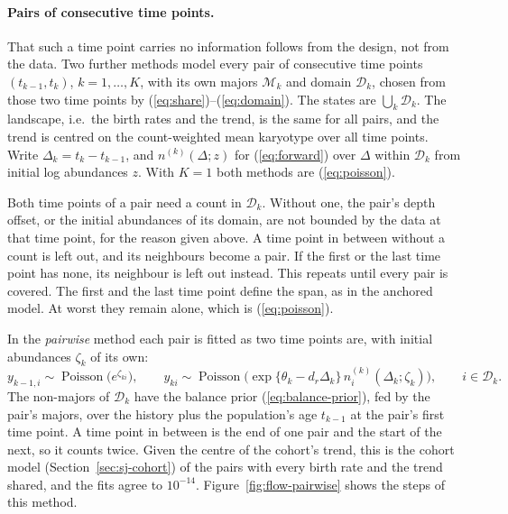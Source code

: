 \documentclass[11pt]{article}
\begin{document}
\paragraph{Pairs of consecutive time points.}
That such a time point carries no information follows from the design, not from
the data. Two further methods model every pair of consecutive time points
$(t_{k-1},t_k)$, $k=1,\dots,K$, with its own majors $\mathcal{M}_k$ and domain
$\mathcal{D}_k$, chosen from those two time points by (\ref{eq:share})--(\ref{eq:domain}).
The states are $\bigcup_k\mathcal{D}_k$. The landscape, i.e.\ the birth rates
and the trend, is the same for all pairs, and the trend is centred on the
count-weighted mean karyotype over all time points. Write $\Delta_k=t_k-t_{k-1}$, and
$n^{(k)}(\Delta;z)$ for (\ref{eq:forward}) over $\Delta$ within $\mathcal{D}_k$ from
initial log abundances $z$. With $K=1$ both methods are (\ref{eq:poisson}).

Both time points of a pair need a count in $\mathcal{D}_k$. Without one, the
pair's depth offset, or the initial abundances of its domain, are not bounded
by the data at that time point, for the reason given above. A time point in
between without a count is left out, and its neighbours become a pair. If the
first or the last time point has none, its neighbour is left out instead. This
repeats until every pair is covered. The first and the last time point define the span, as in the
anchored model. At worst they remain alone, which is (\ref{eq:poisson}).

In the \emph{pairwise} method each pair is fitted as two time points are, with
initial abundances $\zeta_{k}$ of its own:
\begin{equation}
  y_{k-1,i}\sim\operatorname{Poisson}\bigl(e^{\zeta_{ki}}\bigr),
  \qquad
  y_{ki}\sim\operatorname{Poisson}\bigl(\exp\{\theta_k-d_r\Delta_k\}\,n^{(k)}_i(\Delta_k;\zeta_k)\bigr),
  \qquad i\in\mathcal{D}_k .
  \label{eq:pairwise}
\end{equation}
The non-majors of $\mathcal{D}_k$ have the balance prior
(\ref{eq:balance-prior}), fed by the pair's majors, over the history plus the
population's age $t_{k-1}$ at the pair's first time point. A time point in between is
the end of one pair and the start of the next, so it counts twice. Given the
centre of the cohort's trend, this is the cohort model
(Section~\ref{sec:sj-cohort}) of the pairs with every birth rate and the trend
shared, and the fits agree to $10^{-14}$. Figure~\ref{fig:flow-pairwise}
shows the steps of this method.
\end{document}
